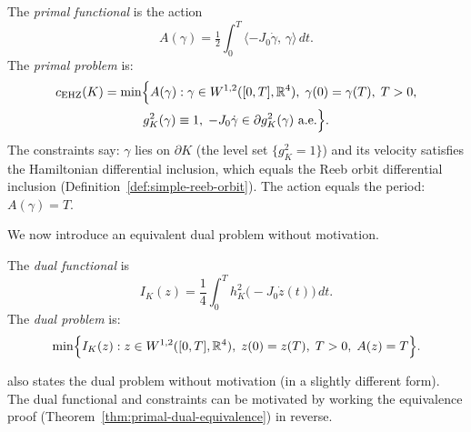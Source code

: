 \begin{definition}\label{def:primal-problem}
The \emph{primal functional} is the action
\[
  A(\gamma) = \tfrac{1}{2}\int_0^T
  \langle -J_0\dot{\gamma},\, \gamma \rangle\, dt.
\]
The \emph{primal problem} is:
\begin{multline}\label{eq:primal-problem}
  c_{\mathrm{EHZ}}(K) = \min \Bigl\{ A(\gamma) :
  \gamma \in W^{1,2}([0,T], \mathbb{R}^4),\;
  \gamma(0) = \gamma(T),\;
  T > 0, \\
  g_K^2(\gamma) \equiv 1,\;
  -J_0\dot{\gamma} \in \partial g_K^2(\gamma) \text{ a.e.} \Bigr\}.
\end{multline}
The constraints say: $\gamma$ lies on $\partial K$
(the level set $\{g_K^2 = 1\}$) and its velocity satisfies the
Hamiltonian differential inclusion, which equals the Reeb orbit
differential inclusion (Definition~\ref{def:simple-reeb-orbit}).
The action equals the period: $A(\gamma) = T$.
\end{definition}

We now introduce an equivalent dual problem without motivation.

\begin{definition}\label{def:dual-problem}
The \emph{dual functional} is
\[
  I_K(z) = \frac{1}{4} \int_0^T h_K^2\bigl( -J_0 \dot{z}(t) \bigr) \, dt.
\]
The \emph{dual problem} is:
\begin{equation}\label{eq:dual-problem}
  \min \Bigl\{ I_K(z) :
  z \in W^{1,2}([0,T], \mathbb{R}^4),\;
  z(0) = z(T),\;
  T > 0,\;
  A(z) = T \Bigr\}.
\end{equation}
\end{definition}

\cite{HK2017} also states the dual problem without motivation
(in a slightly different form).
The dual functional and constraints can be motivated by working
the equivalence proof
(Theorem~\ref{thm:primal-dual-equivalence}) in reverse.

